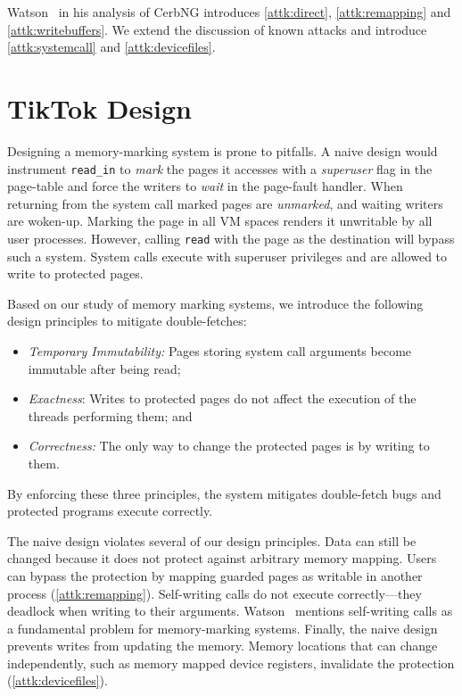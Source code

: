 \documentclass[conference]{IEEEtran}
\newcommand{\sysname}{TikTok}
\begin{document}
Watson~\cite{watson2007exploiting} in his analysis of CerbNG introduces
\autoref{attk:direct}, \autoref{attk:remapping} and \autoref{attk:writebuffers}.
We extend the discussion of known attacks and introduce
\autoref{attk:systemcall} and \autoref{attk:devicefiles}.


\section{\sysname{} Design} \label{sec:design}

Designing a memory-marking system is prone to pitfalls. A naive design would
instrument \texttt{read\_in} to \emph{mark} the pages it accesses with a
\emph{superuser} flag in the page-table and force the writers to \emph{wait} in
the page-fault handler. When returning from the system call marked pages are
\emph{unmarked}, and waiting writers are woken-up. Marking the page in all VM
spaces renders it unwritable by all user processes. However, calling
\texttt{read} with the page as the destination will bypass such a system. System
calls execute with superuser privileges and are allowed to write to protected
pages.

Based on our study of memory marking systems, we introduce the following design
principles to mitigate double-fetches:

\begin{itemize}
  \item \label{policy:immutability} \emph{Temporary Immutability:} Pages storing
  system call arguments become immutable after being read;
  \item \label{policy:exactness} \emph{Exactness}: Writes to protected pages
  do not affect the execution of the threads performing them; and
  \item \label{policy:correctness} \emph{Correctness:} The only way to change the
  protected pages is by writing to them.
\end{itemize}

By enforcing these three principles, the system mitigates double-fetch bugs and
protected programs execute correctly.

The naive design violates several of our design principles. Data can still be
changed because it does not protect against arbitrary memory mapping. Users can
bypass the protection by mapping guarded pages as writable in another process
(\autoref{attk:remapping}). Self-writing calls do not execute correctly---they
deadlock when writing to their arguments. Watson~\cite{watson2007exploiting}
mentions self-writing calls as a fundamental problem for memory-marking systems.
Finally, the naive design prevents writes from updating the memory. Memory
locations that can change independently, such as memory mapped device registers,
invalidate the protection (\autoref{attk:devicefiles}).
\end{document}

